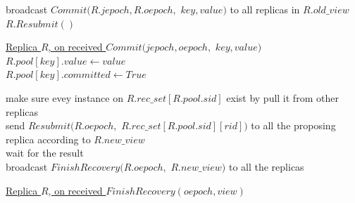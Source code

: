 \documentclass[twocolumn]{article}
\begin{document}
\begin{algorithm}
    \caption{$Commit(key, value)$}
    \label{alg:jetpack_commit}
    \setcounter{AlgoLine}{97}

    broadcast $Commit(R.jepoch, R.oepoch,$ $key, value)$ to all replicas in $R.old\_view$\\
    $R.Resubmit()$\\
    

    \vskip 10pt
    
    \underline{Replica $R$, on received $Commit(jepoch, oepoch,  $}
    \underline{$key, value)$}\\
     {
        $R.pool[key].value\gets value$\\
        $R.pool[key].committed\gets True$\\
    }
\end{algorithm}

\begin{algorithm}
    \caption{$Resubmit()$}
    \label{alg:jetpack_resubmit}
    \setcounter{AlgoLine}{103}
    make sure evey instance on $R.rec\_set[R.pool.sid]$ exist by pull it from other replicas\\
     {
        send $Resubmit(R.oepoch,$ $R.rec\_set[R.pool.sid][rid])$ to all the proposing replica according to $R.new\_view$\\
        wait for the result\\
    }
    broadcast $FinishRecovery(R.oepoch,$ $R.new\_view)$ to all the replicas\\

    
    
    \vskip 10pt
    
    
    \underline{Replica $R$, on received $FinishRecovery(oepoch, view)$}\\
\end{algorithm}
\end{document}
